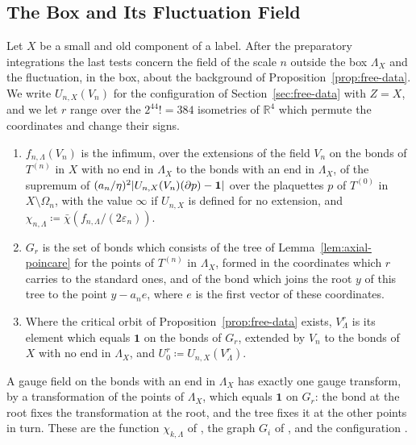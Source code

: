 \documentclass[11pt]{preprint}
\newcommand{\id}{\mathbf 1}
\DeclarePairedDelimiter{\abs}{\lvert}{\rvert}
\numberwithin{equation}{section}
\begin{document}
\subsection{The Box and Its Fluctuation Field}\label{sec:box}

Let $X$ be a small and old component of a label. After the preparatory integrations the last tests concern the field of the scale $n$ outside the box $\Lambda_X$ and the fluctuation, in the box, about the background of Proposition~\ref{prop:free-data}. We write $U_{n,X}(V_n)$ for the configuration of Section~\ref{sec:free-data} with $Z = X$, and we let $r$ range over the $2^44! = 384$ isometries of $\mathbb R^4$ which permute the coordinates and change their signs.

\begin{definition}\label{def:box-background}
\begin{enumerate}[label=(\roman*)]
\item $f_{n,\Lambda}(V_n)$ is the infimum, over the extensions of the field $V_n$ on the bonds of $T^{(n)}$ in $X$ with no end in $\Lambda_X$ to the bonds with an end in $\Lambda_X$, of the supremum of $(a_n/\eta)^2\abs{U_{n,X}(V_n)(\partial p) - \id}$ over the plaquettes $p$ of $T^{(0)}$ in $X \setminus \Omega_n$, with the value $\infty$ if $U_{n,X}$ is defined for no extension, and $\chi_{n,\Lambda} \coloneqq \bar\chi(f_{n,\Lambda}/(2\varepsilon_n))$.
\item $G_r$ is the set of bonds which consists of the tree of Lemma~\ref{lem:axial-poincare} for the points of $T^{(n)}$ in $\Lambda_X$, formed in the coordinates which $r$ carries to the standard ones, and of the bond which joins the root $y$ of this tree to the point $y - a_ne$, where $e$ is the first vector of these coordinates.
\item Where the critical orbit of Proposition~\ref{prop:free-data} exists, $V^r_\Lambda$ is its element which equals $\id$ on the bonds of $G_r$, extended by $V_n$ to the bonds of $X$ with no end in $\Lambda_X$, and $U^r_0 \coloneqq U_{n,X}(V^r_\Lambda)$.
\end{enumerate}
\end{definition}

A gauge field on the bonds with an end in $\Lambda_X$ has exactly one gauge transform, by a transformation of the points of $\Lambda_X$, which equals $\id$ on $G_r$: the bond at the root fixes the transformation at the root, and the tree fixes it at the other points in turn. These are the function $\chi_{k,\Lambda}$ of \cite[(1.75)]{BalabanLFR1}, the graph $G_i$ of \cite[(1.100)]{BalabanLFR1}, and the configuration \cite[(1.79), (1.83)]{BalabanLFR1}.
\end{document}
